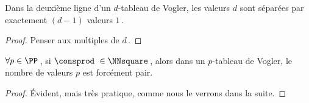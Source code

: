 

\begin{fact}
	Dans la deuxième ligne d'un $d$-tableau de Vogler, les valeurs $d$ sont séparées par exactement $(d-1)$ valeurs $1$\,.
\end{fact}


\begin{proof}
	Penser aux multiples de $d$\,.
\end{proof}




\begin{fact} \label{vogler-parity-square}
	$\forall p \in \PP$\,, si $\consprod\ \in \NNsquare$\,, alors dans un $p$-tableau de Vogler, le nombre de valeurs $p$ est forcément pair.
\end{fact}


\begin{proof}
	Évident, mais très pratique, comme nous le verrons dans la suite.
\end{proof}


